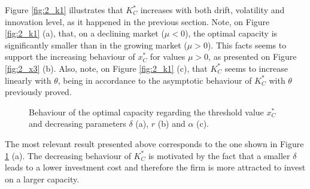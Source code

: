 Figure \ref{fig:2_k1} illustrates that $K^*_C$ increases with both drift, volatility and innovation level, as it happened in the previous section. 
Note, on Figure \ref{fig:2_k1} (a), that, on a declining market ($\mu<0$), the optimal capacity is significantly smaller than in the growing market ($\mu>0$). This facts seems to support the increasing behaviour of $x^*_C$ for values $\mu>0$, as presented on Figure \ref{fig:2_x3} (b).
Also, note, on Figure \ref{fig:2_k1} (c), that $K^*_C$ seems to increase linearly with $\theta$, being in accordance to the asymptotic behaviour of $K_C^*$ with $\theta$ previously proved.

\begin{figure}[!htb]
	\begin{subfigmatrix}{3}
	\end{subfigmatrix}
	\caption{Behaviour of the optimal capacity regarding the threshold value $x^*_C$ and decreasing parameters $\delta$ (a), $r$ (b) and $\alpha$ (c).}
	\label{fig:2_k3}
\end{figure}

The most relevant result presented above corresponds to the one shown in Figure \ref{fig:2_k3} (a). The decreasing behaviour of $K^*_C$ is motivated by the fact that a smaller $\delta$ leads to a lower investment cost and therefore the firm is more attracted to invest on a larger capacity.

